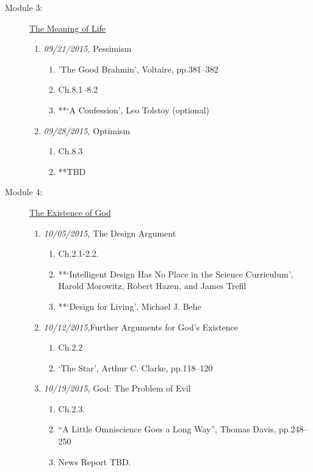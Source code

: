 \documentclass[article,oneside]{memoir}
\begin{document}
\begin{description}
\item[Module 3:] \href{http://scoconno.github.io/Teaching/Examined/Meaning/}{The Meaning of Life}

\begin{enumerate}
\item \textit{09/21/2015,} Pessimism 
\begin{enumerate}
\item 'The Good Brahmin', Voltaire, pp.381--382
\item Ch.8.1--8.2 
\item **`A Confession', Leo Tolstoy (optional)
\end{enumerate}

\item \textit{09/28/2015,} Optimism
\begin{enumerate}
\item Ch.8.3
\item **TBD 
\end{enumerate}
\end{enumerate}

\item[Module 4: ] \href{http://scoconno.github.io/Teaching/Examined/God/}{The Existence of God}

\begin{enumerate}
\item \textit{10/05/2015,} The Design Argument
\begin{enumerate}
\item Ch.2.1-2.2. 
\item **`Intelligent Design Has No Place in the Science Curriculum', Harold Morowitz, Robert Hazen, and James Trefil
 \item **`Design for Living', Michael J. Behe
 \end{enumerate}
 
\item \textit{10/12/2015,}Further Arguments for God's Existence
\begin{enumerate}
\item Ch.2.2
\item `The Star', Arthur C. Clarke, pp.118--120
\end{enumerate}

\item \textit{10/19/2015,} God: The Problem of Evil 
\begin{enumerate}
\item Ch.2.3.
\item ``A Little Omniscience Goes a Long Way'', Thomas Davis, pp.248--250
\item News Report TBD. 
\end{enumerate}
\end{enumerate}


\end{description}
\end{document}
